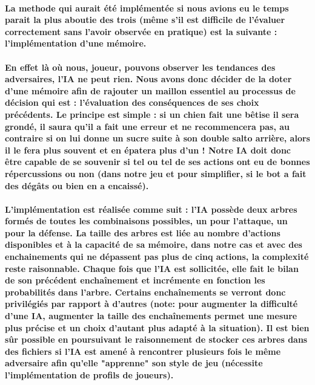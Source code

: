 \paragraph{La methode qui aurait été implémentée si nous avions eu le temps parait la plus aboutie des trois (même s'il est difficile de l'évaluer correctement sans l'avoir observée en pratique) est la suivante : l'\textbf{implémentation d'une mémoire}.}

\paragraph{En effet là où nous, joueur, pouvons observer les tendances des adversaires, l'IA ne peut rien. Nous avons donc décider de la doter d'une mémoire afin de rajouter un maillon essentiel au processus de décision qui est : l'évaluation des conséquences de ses choix précédents. Le principe est simple : si un chien fait une bêtise il sera grondé, il saura qu'il a fait une erreur et ne recommencera pas, au contraire si on lui donne un sucre suite à son double salto arrière, alors il le fera plus souvent et en épatera plus d'un ! Notre IA doit donc être capable de se souvenir si tel ou tel de ses actions ont eu de bonnes répercussions ou non (dans notre jeu et pour simplifier, si le bot a fait des dégâts ou bien en a encaissé).}

\paragraph{L'implémentation est réalisée comme suit : l'IA possède deux arbres formés de toutes les combinaisons possibles, un pour l'attaque, un pour la défense. La taille des arbres est liée au nombre d'actions disponibles et à la capacité de sa mémoire, dans notre cas et avec des enchainements qui ne dépassent pas plus de cinq actions, la complexité reste raisonnable. Chaque fois que l'IA est sollicitée, elle fait le bilan de son précédent encha\^inement et incrémente en fonction les probabilités dans l'arbre. Certains encha\^inements se verront donc privilégiés par rapport à d'autres (note: pour augmenter la difficulté d'une IA, augmenter la taille des encha\^inements permet une mesure plus précise et un choix d'autant plus adapté à la situation). Il est bien sûr possible en poursuivant le raisonnement de stocker ces arbres dans des fichiers si l'IA est amené à rencontrer plusieurs fois le même adversaire afin qu'elle "apprenne" son style de jeu (nécessite l'implémentation de profils de joueurs).}



